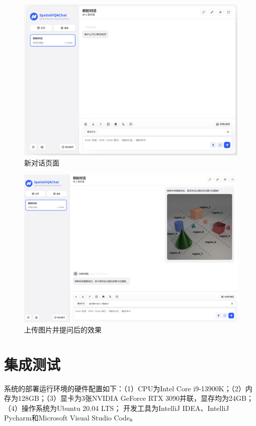 \begin{figure}[htbp]
    \centering
    \includegraphics[width=\textwidth]{figures/frontend-welcome-page.png}
    \caption{新对话页面}
    \label{fig:welcome-page}
\end{figure}
\begin{figure}[htbp]
    \centering
    \includegraphics[width=\textwidth]{figures/question.png}
    \caption{上传图片并提问后的效果}
    \label{fig:question}
\end{figure}

\section{集成测试}
系统的部署运行环境的硬件配置如下：（1）CPU为Intel Core i9-13900K；（2）内存为128GB；（3）显卡为3张NVIDIA GeForce RTX 3090并联，显存均为24GB；（4）操作系统为Ubuntu 20.04 LTS；
开发工具为IntelliJ IDEA、IntelliJ Pycharm和Microsoft Visual Studio Code。

